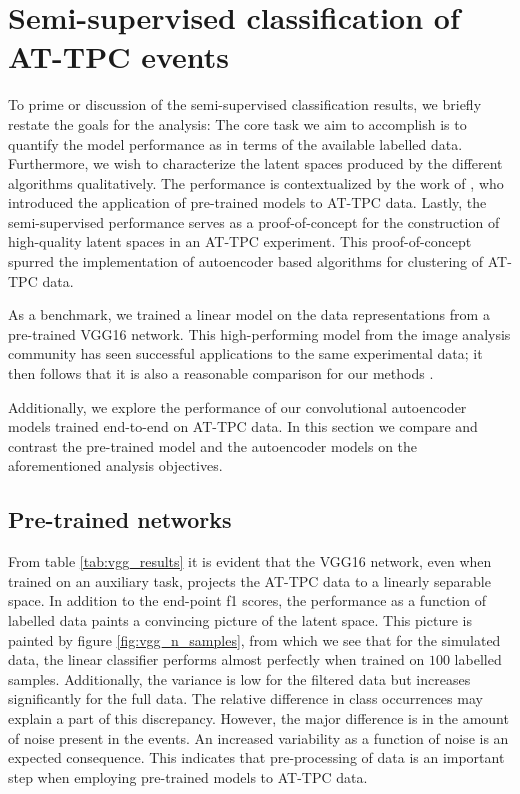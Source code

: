 \section{Semi-supervised classification of AT-TPC events}

To prime or discussion of the semi-supervised classification results, we briefly restate the goals for the analysis: The core task we aim to accomplish is to quantify the model performance as in terms of the available labelled data. Furthermore, we wish to characterize the latent spaces produced by the different algorithms qualitatively. The performance is contextualized by the work of \citet{Kuchera2019}, who introduced the application of pre-trained models to AT-TPC data. Lastly, the semi-supervised performance serves as a proof-of-concept for the construction of high-quality latent spaces in an AT-TPC experiment. This proof-of-concept spurred the implementation of autoencoder based algorithms for clustering of AT-TPC data.

As a benchmark, we trained a linear model on the data representations from a pre-trained VGG16 network. This high-performing model from the image analysis community has seen successful applications to the same experimental data; it then follows that it is also a reasonable comparison for our methods \cite{Kuchera2019}. 

Additionally, we explore the performance of our convolutional autoencoder models trained end-to-end on AT-TPC data. In this section we compare and contrast the pre-trained model and the autoencoder models on the aforementioned analysis objectives.

\subsection{Pre-trained networks}

From table \ref{tab:vgg_results} it is evident that the VGG16 network, even when trained on an auxiliary task, projects the AT-TPC data to a linearly separable space. In addition to the end-point f1 scores, the performance as  a function of labelled data paints a convincing picture of the latent space. This picture is painted by figure \ref{fig:vgg_n_samples}, from which we see that for the simulated data, the linear classifier performs almost perfectly when trained on $100$ labelled samples. Additionally, the variance is low for the filtered data but increases significantly for the full data. The relative difference in class occurrences may explain a part of this discrepancy. However, the major difference is in the amount of noise present in the events. An increased variability as a function of noise is an expected consequence. This indicates that pre-processing of data is an important step when employing pre-trained models to AT-TPC data. 


